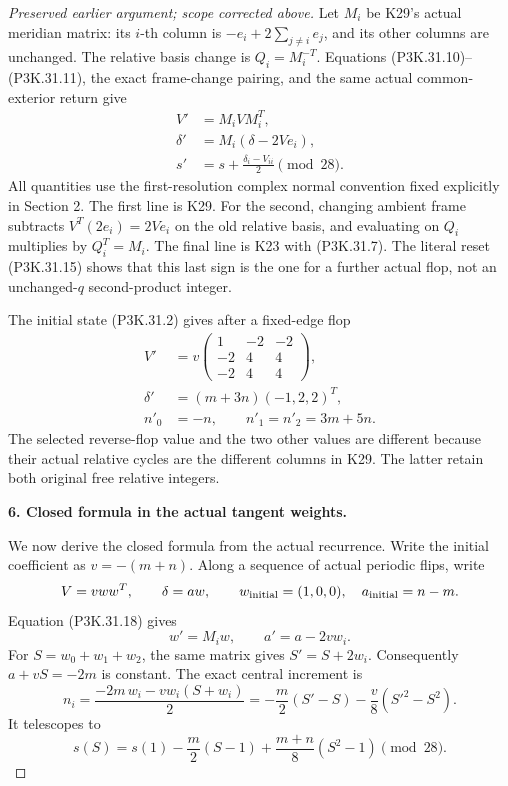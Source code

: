 \begin{proof}[Preserved earlier argument; scope corrected above]
Let \(M_i\) be K29's actual meridian matrix: its \(i\)-th
column is \(-e_i+2\sum_{j\ne i}e_j\), and its other
columns are unchanged. The relative basis change is
\(Q_i=M_i^{-T}\). Equations (P3K.31.10)--(P3K.31.11), the exact
frame-change pairing, and the same actual common-exterior
return give
\[
 \begin{split}
 V'&=M_iVM_i^T,\\
 \delta'&=M_i(\delta-2Ve_i),\\
 s'&=s+\frac{\delta_i-V_{ii}}2\pmod{28}.
 \end{split}                                             \tag{P3K.31.18}
\]
All quantities use the first-resolution complex normal
convention fixed explicitly in Section 2.
The first line is K29. For the second, changing ambient
frame subtracts \(V^T(2e_i)=2Ve_i\) on the old relative
basis, and evaluating on \(Q_i\) multiplies by
\(Q_i^T=M_i\). The final line is K23 with (P3K.31.7).
The literal reset (P3K.31.15) shows that this last sign is
the one for a further actual flop, not an unchanged-\(q\)
second-product integer.

The initial state (P3K.31.2) gives after a fixed-edge flop
\[
 \begin{split}
 V'&=v\begin{pmatrix}1&-2&-2\\-2&4&4\\-2&4&4\end{pmatrix},\\
 \delta'&=(m+3n)(-1,2,2)^T,\\
 n'_0&=-n,\qquad n'_1=n'_2=3m+5n .
 \end{split}                                             \tag{P3K.31.19}
\]
The selected reverse-flop value and the two other
values are different because their actual relative
cycles are the different columns in K29. The latter
retain both original free relative integers.

\par\medskip\noindent\textbf{6. Closed formula in the actual tangent weights.}\enspace

We now derive the closed formula from the actual recurrence.
Write the initial coefficient as \(v=-(m+n)\). Along a
sequence of actual periodic flips, write
\[
                  V=vww^T,\qquad \delta=a w,
 \qquad w_{\rm initial}=(1,0,0),\quad a_{\rm initial}=n-m .
\]
Equation (P3K.31.18) gives
\[
       w'=M_iw,\qquad a'=a-2v w_i.
                                                        \tag{P3K.31.20}
\]
For \(S=w_0+w_1+w_2\), the same matrix gives
\(S'=S+2w_i\). Consequently \(a+vS=-2m\) is constant.
The exact central increment is
\[
 n_i=\frac{-2m\,w_i-vw_i(S+w_i)}2
     =-\frac m2(S'-S)-\frac v8(S'^2-S^2).
                                                        \tag{P3K.31.21}
\]
It telescopes to
\[
          s(S)=s(1)-\frac m2(S-1)
                         +\frac{m+n}{8}(S^2-1)\pmod{28}.
                                                        \tag{P3K.31.22}
\]


\end{proof}
